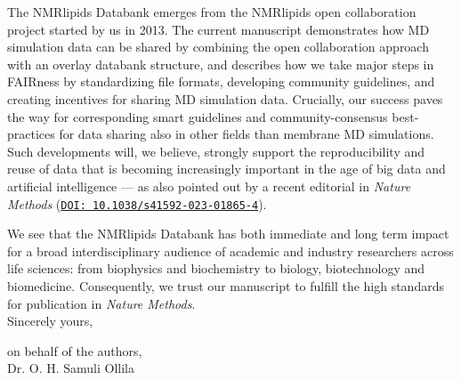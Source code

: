 \documentclass[11pt]{letter}
\begin{document}
The NMRlipids Databank emerges from the NMRlipids open collaboration project started by us in 2013.
The current manuscript demonstrates how MD simulation data can be shared by combining the open collaboration approach with an overlay databank structure, and describes how we take major steps in FAIRness by standardizing file formats, developing community guidelines, and creating incentives for sharing MD simulation data. Crucially, our success paves the way for corresponding smart guidelines and community-consensus best-practices for data sharing also in other fields than membrane MD simulations.
Such developments will, we believe, strongly support the reproducibility and reuse of data that is becoming increasingly important in the age of big data and artificial intelligence --- as also pointed out by a recent editorial in \textit{Nature Methods} (\href{https://doi.org/10.1038/s41592-023-01865-4}{\tt DOI: 10.1038/s41592-023-01865-4}). 

We see that the NMRlipids Databank has both immediate and long term impact for a broad interdisciplinary audience of academic and industry researchers across
life sciences: from biophysics and biochemistry to biology, biotechnology and biomedicine. Consequently, we trust our manuscript to fulfill the high standards for publication in %
\textit{Nature Methods}.\\


Sincerely yours,

on behalf of the authors,\\

Dr. O. H. Samuli Ollila
\end{document}
